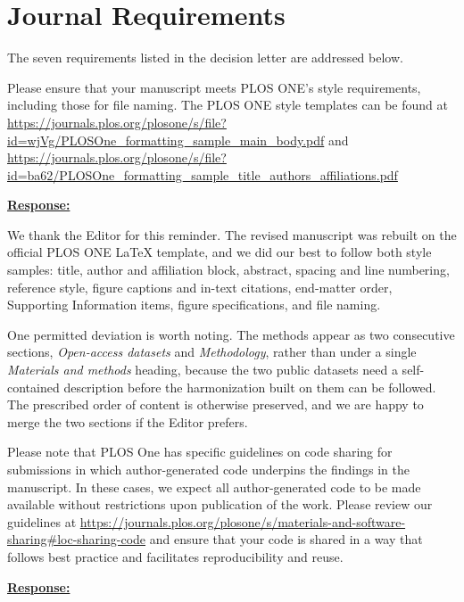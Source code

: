 \documentclass{article}
\begin{document}
\section*{Journal Requirements}

\noindent
The seven requirements listed in the decision letter are addressed below.

\vspace{0.3cm}

\begin{cmt}{}{}

Please ensure that your manuscript meets PLOS ONE's style requirements,
including those for file naming. The PLOS ONE style templates can be found at
\url{https://journals.plos.org/plosone/s/file?id=wjVg/PLOSOne_formatting_sample_main_body.pdf}
and
\url{https://journals.plos.org/plosone/s/file?id=ba62/PLOSOne_formatting_sample_title_authors_affiliations.pdf}

\end{cmt}
\vspace{0.1cm}
\noindent
\underline{\textbf{Response:}}
\vspace{0.2cm}

We thank the Editor for this reminder. The revised manuscript was rebuilt on
the official PLOS ONE \LaTeX{} template, and we did our best to follow both
style samples: title, author and affiliation block, abstract, spacing and line
numbering, reference style, figure captions and in-text citations, end-matter
order, Supporting Information items, figure specifications, and file naming.

One permitted deviation is worth noting. The methods appear as two consecutive
sections, \emph{Open-access datasets} and \emph{Methodology}, rather than under
a single \emph{Materials and methods} heading, because the two public datasets
need a self-contained description before the harmonization built on them can be
followed. The prescribed order of content is otherwise preserved, and we are
happy to merge the two sections if the Editor prefers.

\vspace{0.3cm}


\begin{cmt}{}{}

Please note that PLOS One has specific guidelines on code sharing for
submissions in which author-generated code underpins the findings in the
manuscript. In these cases, we expect all author-generated code to be made
available without restrictions upon publication of the work. Please review our
guidelines at
\url{https://journals.plos.org/plosone/s/materials-and-software-sharing#loc-sharing-code}
and ensure that your code is shared in a way that follows best practice and
facilitates reproducibility and reuse.

\end{cmt}
\vspace{0.1cm}
\noindent
\underline{\textbf{Response:}}
\vspace{0.2cm}
\end{document}
